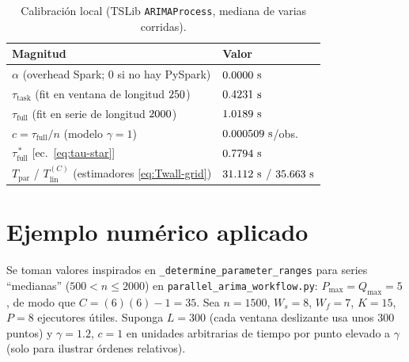 \documentclass[11pt,a4paper]{article}
\begin{document}
\begin{table}[htbp]
  \centering
  \caption{Calibración local (TSLib \texttt{ARIMAProcess}, mediana de varias corridas).}
  \label{tab:calib}
  \begin{tabular}{@{}ll@{}}
    \toprule
    Magnitud & Valor \\
    \midrule
    $\alpha$ (overhead Spark; $0$ si no hay PySpark) &
      $\CalAlphaNum\ \mathrm{s}$ \\
    $\tau_{\mathrm{task}}$ (fit en ventana de longitud $250$) &
      $\CalTauTaskNum\ \mathrm{s}$ \\
    $\tau_{\mathrm{full}}$ (fit en serie de longitud $2000$) &
      $\CalTauFullNum\ \mathrm{s}$ \\
    $c=\tau_{\mathrm{full}}/n$ (modelo $\gamma=1$) &
      $\CalCPerObsNum\ \mathrm{s}$/obs. \\
    $\tau_{\mathrm{full}}^{\,*}$ [ec.~\eqref{eq:tau-star}] &
      $\CalTauStarNum\ \mathrm{s}$ \\
    $T_{\mathrm{par}}$ / $T_{\mathrm{lin}}^{(C)}$ (estimadores \eqref{eq:Twall-grid}) &
      $\CalTParEstNum\ \mathrm{s}$ / $\CalTLinEstNum\ \mathrm{s}$ \\
    \bottomrule
  \end{tabular}
\end{table}


\section{Ejemplo numérico aplicado}

Se toman valores inspirados en \texttt{\_determine\_parameter\_ranges} para
series ``medianas'' ($500 < n \le 2000$) en
\texttt{parallel\_arima\_workflow.py}: $P_{\max}=Q_{\max}=5$, de modo que
$C=(6)(6)-1=35$. Sea $n=1500$, $W_s=8$, $W_f=7$, $K=15$, $P=8$ ejecutores
útiles. Suponga $L=300$ (cada ventana deslizante usa unos 300 puntos) y
$\gamma=1.2$, $c=1$ en unidades arbitrarias de tiempo por punto elevado a
$\gamma$ (solo para ilustrar órdenes relativos).
\end{document}
